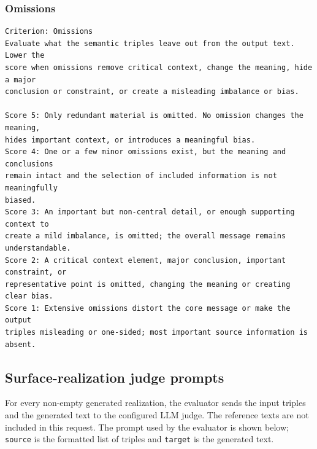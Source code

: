 \subsubsection{Omissions}

\begin{lstlisting}
Criterion: Omissions
Evaluate what the semantic triples leave out from the output text. Lower the
score when omissions remove critical context, change the meaning, hide a major
conclusion or constraint, or create a misleading imbalance or bias.

Score 5: Only redundant material is omitted. No omission changes the meaning,
hides important context, or introduces a meaningful bias.
Score 4: One or a few minor omissions exist, but the meaning and conclusions
remain intact and the selection of included information is not meaningfully
biased.
Score 3: An important but non-central detail, or enough supporting context to
create a mild imbalance, is omitted; the overall message remains
understandable.
Score 2: A critical context element, major conclusion, important constraint, or
representative point is omitted, changing the meaning or creating clear bias.
Score 1: Extensive omissions distort the core message or make the output
triples misleading or one-sided; most important source information is absent.
\end{lstlisting}

\subsection{Surface-realization judge prompts}
\label{app:surface-judge-prompts}

For every non-empty generated realization, the evaluator sends the input
triples and the generated text to the configured LLM judge. The reference texts
are not included in this request. The prompt used by the evaluator is shown
below; \texttt{source} is the formatted list of triples and \texttt{target} is
the generated text.


